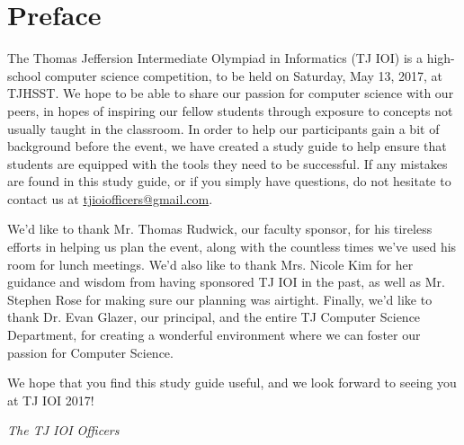\chapter{Preface}

The Thomas Jeffersion Intermediate Olympiad in Informatics (TJ IOI) is a high-school computer science competition, to be held on Saturday, May 13, 2017, at TJHSST.  We hope to be able to share our passion for computer science with our peers, in hopes of inspiring our fellow students through exposure to concepts not usually taught in the classroom.  In order to help our participants gain a bit of background before the event, we have created a study guide to help ensure that students are equipped with the tools they need to be successful.  If any mistakes are found in this study guide, or if you simply have questions, do not hesitate to contact us at \href{mailto:tjioiofficers@gmail.com}{tjioiofficers@gmail.com}.

We'd like to thank Mr. Thomas Rudwick, our faculty sponsor, for his tireless efforts in helping us plan the event, along with the countless times we've used his room for lunch meetings. We'd also like to thank Mrs. Nicole Kim for her guidance and wisdom from having sponsored TJ IOI in the past, as well as Mr. Stephen Rose for making sure our planning was airtight. Finally, we'd like to thank Dr. Evan Glazer, our principal, and the entire TJ Computer Science Department, for creating a wonderful environment where we can foster our passion for Computer Science.

We hope that you find this study guide useful, and we look forward to seeing you at TJ IOI 2017!

\noindent\textit{The TJ IOI Officers} \\